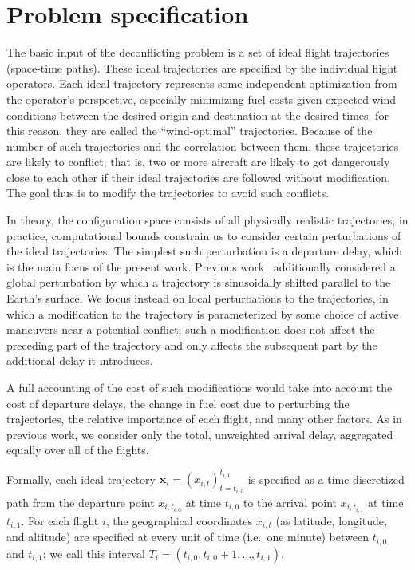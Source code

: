 \section{Problem specification}
\label{sec:problem_specification}

The basic input of the deconflicting problem is a set of ideal flight trajectories (space-time paths).
These ideal trajectories are specified by the individual flight operators.
Each ideal trajectory represents some independent optimization from the operator's perspective, especially minimizing fuel costs given expected wind conditions between the desired origin and destination at the desired times;
for this reason, they are called the ``wind-optimal'' trajectories.
Because of the number of such trajectories and the correlation between them, these trajectories are likely to conflict; that is, two or more aircraft are likely to get dangerously close to each other if their ideal trajectories are followed without modification.
The goal thus is to modify the trajectories to avoid such conflicts.

In theory, the configuration space consists of all physically realistic trajectories; in practice, computational bounds constrain us to consider certain perturbations of the ideal trajectories.
The simplest such perturbation is a departure delay, which is the main focus of the present work.
Previous work~\cite{rodionova16} additionally considered a global perturbation by which a trajectory is sinusoidally shifted parallel to the Earth's surface.
We focus instead on local perturbations to the trajectories, in which a modification to the trajectory is parameterized by some choice of active maneuvers near a potential conflict; such a modification does not affect the preceding part of the trajectory and only affects the subsequent part by the additional delay it introduces.

A full accounting of the cost of such modifications would take into account the cost of departure delays, the change in fuel cost due to perturbing the trajectories, the relative importance of each flight, and many other factors.
As in previous work, we consider only the total, unweighted arrival delay, aggregated equally over all of the flights.

Formally, each ideal trajectory $\mathbf x_i = {\left(x_{i, t}\right)}_{t=t_{i,0}}^{t_{i,1}}$ is specified as a time-discretized path from the departure point $x_{i, t_{i, 0}}$ at time $t_{i, 0}$ to the arrival point $x_{i, t_{i, 1}}$ at time $t_{i, 1}$.
For each flight $i$, the geographical coordinates $x_{i,t}$ (as latitude, longitude, and altitude) are specified at every unit of time (i.e.\ one minute) between $t_{i,0}$ and $t_{i,1}$;
we call this interval $T_i = \left(t_{i,0}, t_{i, 0} + 1, \ldots, t_{i,1}\right)$.

